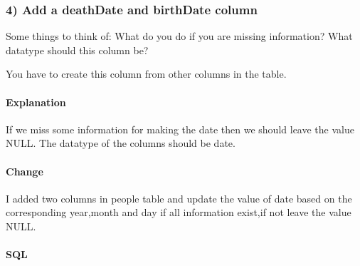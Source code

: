 \documentclass[11pt]{article}
\begin{document}
    \hypertarget{add-a-deathdate-and-birthdate-column}{%
\subsubsection{4) Add a deathDate and birthDate
column}\label{add-a-deathdate-and-birthdate-column}}

Some things to think of: What do you do if you are missing information?
What datatype should this column be?

You have to create this column from other columns in the table.

\hypertarget{explanation}{%
\paragraph{Explanation}\label{explanation}}

    If we miss some information for making the date then we should leave the
value NULL. The datatype of the columns should be date.

    \hypertarget{change}{%
\paragraph{Change}\label{change}}

    I added two columns in people table and update the value of date based
on the corresponding year,month and day if all information exist,if not
leave the value NULL.

    \hypertarget{sql}{%
\paragraph{SQL}\label{sql}}
\end{document}
